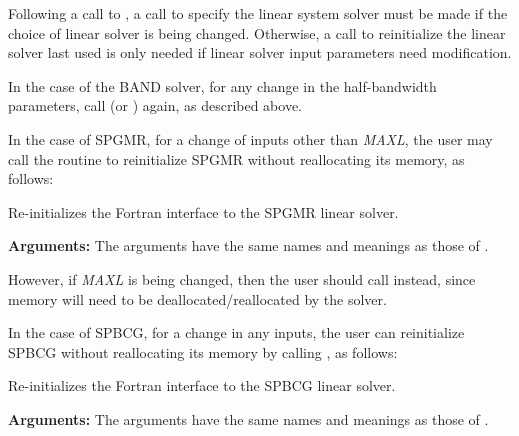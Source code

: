 \documentclass[letterpaper,10pt,english]{sphinxmanual}
\begin{document}
Following a call to {\hyperref[f_interface/Usage:f/_/FARKREINIT]{}}, a call to specify the
linear system solver must be made if the choice of linear solver is
being changed.  Otherwise, a call to reinitialize the linear solver
last used is only needed if linear solver input parameters need
modification.

In the case of the BAND solver, for any change in the
half-bandwidth parameters, call {\hyperref[f_interface/Usage:f/_/FARKBAND]{}} (or
{\hyperref[f_interface/Usage:f/_/FARKLAPACKBAND]{}}) again, as described above.

In the case of SPGMR, for a change of inputs other than \emph{MAXL},
the user may call the routine {\hyperref[f_interface/Usage:f/_/FARKSPGMRREINIT]{}} to
reinitialize SPGMR without reallocating its memory, as follows:

\begin{fulllineitems}
\label{f_interface/Usage:f/_/FARKSPGMRREINIT}
Re-initializes the Fortran interface to the SPGMR linear solver.

\textbf{Arguments:}  The arguments have the same names and meanings as those of
{\hyperref[f_interface/Usage:f/_/FARKSPGMR]{}}.

\end{fulllineitems}


However, if \emph{MAXL} is being changed, then the user should call
{\hyperref[f_interface/Usage:f/_/FARKSPGMR]{}} instead, since memory will need to be
deallocated/reallocated by the solver.

In the case of SPBCG, for a change in any inputs, the user can
reinitialize SPBCG without reallocating its memory by calling
{\hyperref[f_interface/Usage:f/_/FARKSPBCGREINIT]{}}, as follows:

\begin{fulllineitems}
\label{f_interface/Usage:f/_/FARKSPBCGREINIT}
Re-initializes the Fortran interface to the SPBCG
linear solver.

\textbf{Arguments:}  The arguments have the same names and meanings as
those of {\hyperref[f_interface/Usage:f/_/FARKSPBCG]{}}.

\end{fulllineitems}
\end{document}
